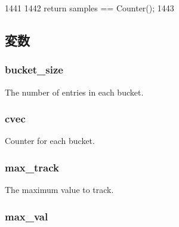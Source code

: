 \begin{DoxyCode}
1441     {
1442         return samples == Counter();
1443     }
\end{DoxyCode}


\subsection{変数}
\hypertarget{classStats_1_1DistStor_acf3483d9fb89e37ad01724a4428b3dd2}{
\subsubsection[{bucket\_\-size}]{ {\bf bucket\_\-size}}}
\label{classStats_1_1DistStor_acf3483d9fb89e37ad01724a4428b3dd2}
The number of entries in each bucket. \hypertarget{classStats_1_1DistStor_a8cc2f3a565a2e54ab797f717802bc894}{
\subsubsection[{cvec}]{ {\bf cvec}}}
\label{classStats_1_1DistStor_a8cc2f3a565a2e54ab797f717802bc894}
Counter for each bucket. \hypertarget{classStats_1_1DistStor_accafe9095e4349276ea4de5ce8376dfc}{
\subsubsection[{max\_\-track}]{ {\bf max\_\-track}}}
\label{classStats_1_1DistStor_accafe9095e4349276ea4de5ce8376dfc}
The maximum value to track. \hypertarget{classStats_1_1DistStor_a9791349c8134f44e46aa7688b0a9e92b}{
\subsubsection[{max\_\-val}]{ {\bf max\_\-val}}}
